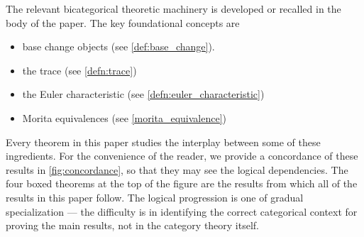 \documentclass[11pt]{amsart}
\begin{document}
The relevant bicategorical theoretic machinery is developed or recalled in the body of the paper. The key foundational concepts are
\begin{itemize}
  \item base change objects (see \cref{def:base_change}). 
  \item the trace (see \cref{defn:trace})
  \item the Euler characteristic (see \cref{defn:euler_characteristic})
  \item Morita equivalences (see \cref{morita_equivalence})
\end{itemize}
Every theorem in this paper studies the interplay between some of these ingredients. For the convenience of the reader, we provide a concordance of these results in \cref{fig:concordance}, so that they may see the logical dependencies. The four boxed theorems at the top of the figure  are the results from which all of the results in this paper follow. The logical progression is one of gradual specialization --- the difficulty is in identifying the correct categorical context for proving the main results, not in the category theory itself. 
\end{document}
